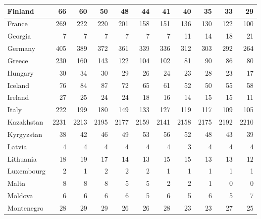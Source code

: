 \begin{table}
\begin{tabular}{|l|r|r|r|r|r|r|r|r|r|r|}
                       Finland&     66&     60&     50&     48&     44&     41&     40&     35&     33&     29\\\hline
                        France&    269&    222&    220&    201&    158&    151&    136&    130&    122&    100\\\hline
                       Georgia&      7&      7&      7&      7&      7&      7&     11&     14&     18&     21\\\hline
                       Germany&    405&    389&    372&    361&    339&    336&    312&    303&    292&    264\\\hline
                        Greece&    230&    160&    143&    122&    104&    102&     81&     90&     86&     80\\\hline
                       Hungary&     30&     34&     30&     29&     26&     24&     23&     28&     23&     17\\\hline
                       Iceland&     76&     84&     87&     72&     65&     61&     52&     50&     55&     58\\\hline
                       Ireland&     27&     25&     24&     24&     18&     16&     14&     15&     15&     11\\\hline
                         Italy&    222&    199&    180&    149&    133&    127&    119&    117&    109&    105\\\hline
                    Kazakhstan&   2231&   2213&   2195&   2177&   2159&   2141&   2158&   2175&   2192&   2210\\\hline
                    Kyrgyzstan&     38&     42&     46&     49&     53&     56&     52&     48&     43&     39\\\hline
                        Latvia&      4&      4&      4&      4&      4&      4&      3&      4&      4&      4\\\hline
                     Lithuania&     18&     19&     17&     14&     13&     15&     15&     13&     13&     12\\\hline
                    Luxembourg&      2&      1&      2&      2&      2&      1&      1&      1&      1&      1\\\hline
                         Malta&      8&      8&      8&      5&      5&      2&      2&      1&      0&      0\\\hline
                       Moldova&      6&      6&      6&      6&      5&      6&      5&      6&      5&      7\\\hline
                    Montenegro&     28&     29&     29&     26&     26&     28&     23&     23&     27&     25\\\hline

\end{tabular}
\end{table}
